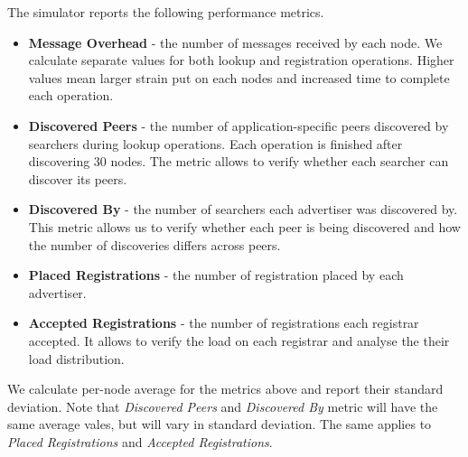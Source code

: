  The simulator reports the following performance metrics. 
 \begin{itemize}
     \item \textbf{Message Overhead} - the number of messages received by each node. We calculate separate values for both lookup and registration operations. Higher values mean larger strain put on each nodes and increased time to complete each operation. 
     \item \textbf{Discovered Peers} - the number of application-specific peers discovered by searchers during lookup operations. Each operation is finished after discovering 30 nodes. The metric allows to verify whether each searcher can discover its peers.
     \item \textbf{Discovered By} - the number of searchers each advertiser was discovered by. This metric allows us to verify whether each peer is being discovered and how the number of discoveries differs across peers.
     \item \textbf{Placed Registrations} - the number of registration placed by each advertiser. 
     \item \textbf{Accepted Registrations} - the number of registrations each  registrar accepted. It allows to verify the load on each registrar and analyse the their load distribution.
 \end{itemize}
 We calculate per-node average for the metrics above and report their standard deviation. Note that \emph{Discovered Peers} and \emph{Discovered By} metric will have the same average vales, but will vary in standard deviation. The same applies to \emph{Placed Registrations} and \emph{Accepted Registrations}. 
 
